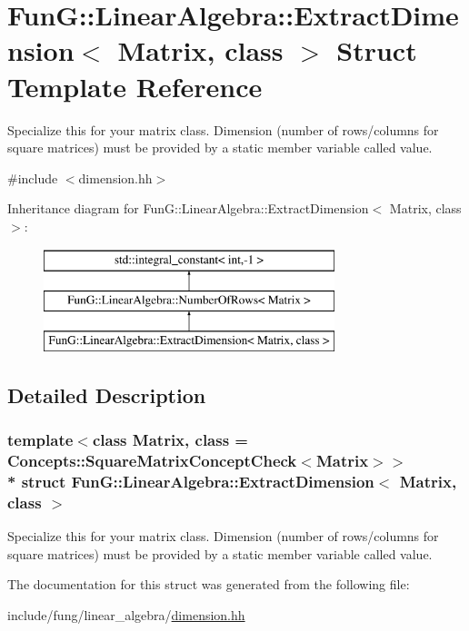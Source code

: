 \hypertarget{structFunG_1_1LinearAlgebra_1_1ExtractDimension}{}\section{FunG\+:\+:Linear\+Algebra\+:\+:Extract\+Dimension$<$ Matrix, class $>$ Struct Template Reference}
\label{structFunG_1_1LinearAlgebra_1_1ExtractDimension}


Specialize this for your matrix class. Dimension (number of rows/columns for square matrices) must be provided by a static member variable called value.  




{\ttfamily \#include $<$dimension.\+hh$>$}

Inheritance diagram for FunG\+:\+:Linear\+Algebra\+:\+:Extract\+Dimension$<$ Matrix, class $>$\+:\begin{figure}[H]
\begin{center}
\leavevmode
\includegraphics[height=3.000000cm]{structFunG_1_1LinearAlgebra_1_1ExtractDimension}
\end{center}
\end{figure}


\subsection{Detailed Description}
\subsubsection*{template$<$class Matrix, class = Concepts\+::\+Square\+Matrix\+Concept\+Check$<$\+Matrix$>$$>$\\*
struct Fun\+G\+::\+Linear\+Algebra\+::\+Extract\+Dimension$<$ Matrix, class $>$}

Specialize this for your matrix class. Dimension (number of rows/columns for square matrices) must be provided by a static member variable called value. 

The documentation for this struct was generated from the following file\+:\begin{DoxyCompactItemize}
\item 
include/fung/linear\+\_\+algebra/\hyperlink{dimension_8hh}{dimension.\+hh}\end{DoxyCompactItemize}
